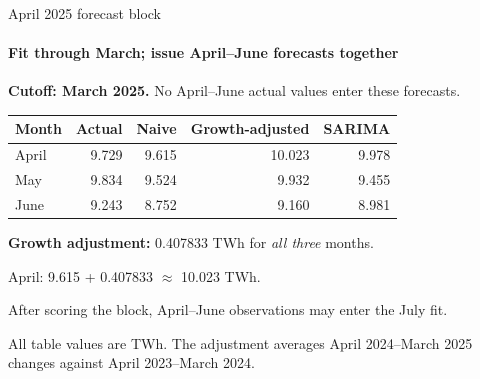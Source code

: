\documentclass[aspectratio=169,10pt]{beamer}
\newcommand{\Source}[1]{\par\vfill{\fontsize{6.5}{7.5}\selectfont\color{black!65}#1\par}}
\newcommand{\SmallTable}{\fontsize{9}{10.5}\selectfont}
\begin{document}
\begin{frame}[t]{April 2025 forecast block}
\framesubtitle{Fit through March; issue April--June forecasts together}
\textbf{Cutoff: March 2025.} No April--June actual values enter these forecasts.
\begin{center}
\SmallTable
\begin{tabularx}{\linewidth}{@{}Xrrrr@{}}\toprule
Month & Actual & Naive & Growth-adjusted & SARIMA\\
\midrule
April & 9.729 & 9.615 & 10.023 & 9.978\\
May & 9.834 & 9.524 & 9.932 & 9.455\\
June & 9.243 & 8.752 & 9.160 & 8.981\\
\bottomrule\end{tabularx}

\end{center}
\textbf{Growth adjustment:} 0.407833 TWh for \emph{all three} months.\par
April: 9.615 + 0.407833 $\approx$ 10.023 TWh.
\par\medskip\par
After scoring the block, April--June observations may enter the July fit.
\Source{All table values are TWh. The adjustment averages April 2024--March 2025 changes against April 2023--March 2024.}
\end{frame}
\end{document}
